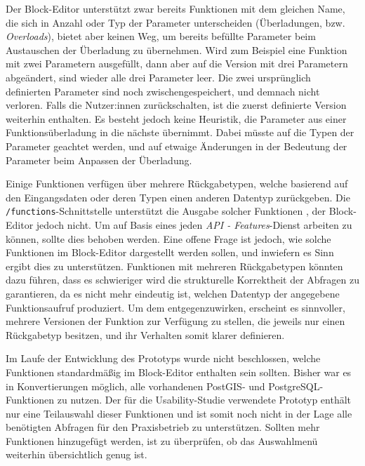 Der Block-Editor unterstützt zwar bereits Funktionen mit dem gleichen Name, die sich in Anzahl oder Typ der Parameter unterscheiden (Überladungen, bzw. \textit{Overloads}), bietet aber keinen Weg, um bereits befüllte Parameter beim Austauschen der Überladung zu übernehmen. Wird zum Beispiel eine Funktion mit zwei Parametern ausgefüllt, dann aber auf die Version mit drei Parametern abgeändert, sind wieder alle drei Parameter leer. Die zwei ursprünglich definierten Parameter sind noch zwischengespeichert, und demnach nicht verloren. Falls die Nutzer:innen zurückschalten, ist die zuerst definierte Version weiterhin enthalten. Es besteht jedoch keine Heuristik, die Parameter aus einer Funktionsüberladung in die nächste übernimmt. Dabei müsste auf die Typen der Parameter geachtet werden, und auf etwaige Änderungen in der Bedeutung der Parameter beim Anpassen der Überladung.

Einige Funktionen verfügen über mehrere Rückgabetypen, welche basierend auf den Eingangsdaten oder deren Typen einen anderen Datentyp zurückgeben. Die \texttt{/functions}-Schnittstelle unterstützt die Ausgabe solcher Funktionen , der Block-Editor jedoch nicht. Um auf Basis eines jeden \textit{API - Features}-Dienst arbeiten zu können, sollte dies behoben werden. Eine offene Frage ist jedoch, wie solche Funktionen im Block-Editor dargestellt werden sollen, und inwiefern es Sinn ergibt dies zu unterstützen. Funktionen mit mehreren Rückgabetypen könnten dazu führen, dass es schwieriger wird die strukturelle Korrektheit der Abfragen zu garantieren, da es nicht mehr eindeutig ist, welchen Datentyp der angegebene Funktionsaufruf produziert. Um dem entgegenzuwirken, erscheint es sinnvoller, mehrere Versionen der Funktion zur Verfügung zu stellen, die jeweils nur einen Rückgabetyp besitzen, und ihr Verhalten somit klarer definieren.

Im Laufe der Entwicklung des Prototyps wurde nicht beschlossen, welche Funktionen standardmäßig im Block-Editor enthalten sein sollten. Bisher war es in Konvertierungen möglich, alle vorhandenen PostGIS- und PostgreSQL-Funktionen zu nutzen. Der für die Usability-Studie verwendete Prototyp enthält nur eine Teilauswahl dieser Funktionen und ist somit noch nicht in der Lage alle benötigten Abfragen für den Praxisbetrieb zu unterstützen. Sollten mehr Funktionen hinzugefügt werden, ist zu überprüfen, ob das Auswahlmenü weiterhin übersichtlich genug ist.
